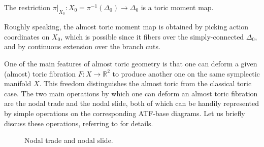 \documentclass[AIF,Unicode,manuscript]{cedram}
\begin{document}
\begin{proposition}
    \label{thm:toricmomentmap}
    The restriction $\pi\vert_{X_0} \colon X_0 = \pi^{-1}(\Delta_0) \rightarrow \Delta_0$ is a toric moment map.
\end{proposition}

Roughly speaking, the almost toric moment map is obtained by picking action coordinates on $X_0$, which is possible since it fibers over the simply-connected $\Delta_0$, and by continuous extension over the branch cuts.

One of the main features of almost toric geometry is that one can deform a given (almost) toric fibration $F \colon X \rightarrow \mathbb{R}^2$ to produce another one on the same symplectic manifold $X$.
This freedom distinguishes the almost toric from the classical toric case.
The two main operations by which one can deform an almost toric fibration are the nodal trade and the nodal slide, both of which can be handily represented by simple operations on the corresponding ATF-base diagrams.
Let us briefly discuss these operations, referring to \cite[Sections 8.2-8.3]{evans2021atfs} for details.

\begin{figure}
  \centering
  \caption{Nodal trade and nodal slide.}
  \label{fig:nodal_trade_and_slide}
\end{figure}
\end{document}
